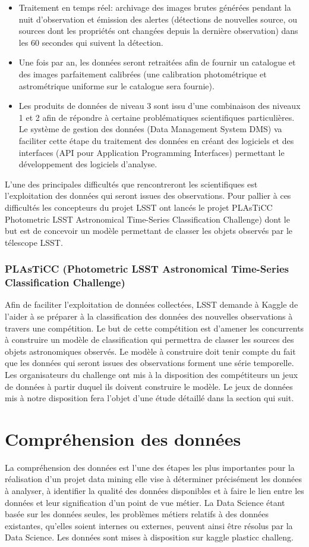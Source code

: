 \begin{itemize}
    \item Traitement en temps réel: archivage des images brutes générées pendant la nuit d'observation et émission des alertes (détections de nouvelles source, ou sources dont les propriétés ont changées depuis la dernière observation) dans les 60 secondes qui suivent la détection.
    \item Une fois par an, les données seront retraitées afin de fournir un catalogue et des images parfaitement calibrées (une calibration photométrique et astrométrique uniforme sur le catalogue sera fournie).
    \item Les produits de données de niveau 3 sont issu d'une combinaison des niveaux 1 et 2 afin de répondre à certaine problématiques scientifiques particulières. Le système de gestion des données (Data Management System DMS) va faciliter cette étape du traitement des données en créant des logiciels et des interfaces (API pour Application Programming Interfaces) permettant le développement des logiciels d'analyse.
\end{itemize}
L’une des principales difficultés que rencontreront les scientifiques est l’exploitation des données qui seront issues des observations.
Pour pallier à ces difficultés les concepteurs du projet LSST ont lancés le projet PLAsTiCC  Photometric LSST Astronomical Time-Series Classification Challenge) dont le but est de concevoir un modèle permettant de classer les objets observés par le télescope LSST.
\subsubsection{PLAsTiCC  (Photometric LSST Astronomical Time-Series Classification Challenge)}
Afin de faciliter l’exploitation de données collectées, LSST demande à Kaggle de l’aider à se préparer à la classification des données des nouvelles observations à travers une compétition. 
Le but de cette compétition est d’amener les concurrents  à construire un modèle de  classification qui permettra de classer  les sources  des objets astronomiques observés. 
Le modèle à construire doit tenir compte du fait que les données qui seront issues des observations forment une série temporelle.
Les organisateurs du challenge ont mis à la disposition des compétiteurs un jeux de données à partir duquel ils doivent construire le modèle.
Le jeux de données mis à notre disposition fera l’objet d’une étude détaillé dans la section qui suit.


\section{Compréhension des données}
La compréhension des données est l’une des étapes les plus importantes pour la réalisation d’un projet data mining elle vise à déterminer précisément les données à analyser, à identifier la qualité des données disponibles et à faire le lien entre les données et leur signification d’un point de vue métier. La Data Science étant basée sur les données seules, les problèmes métiers relatifs à des données existantes, qu’elles soient internes ou externes, peuvent ainsi être résolus par la Data Science.
Les données sont mises à disposition sur kaggle plasticc challeng.

